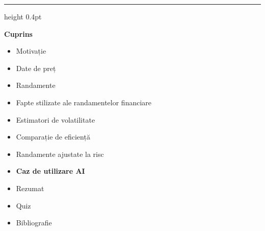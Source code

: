 \documentclass[9pt, aspectratio=169, t]{beamer}
\theoremstyle{definition}
\begin{document}
{
\begin{frame}{}
    {\color{FooterGray}\hrule height 0.4pt}
    \vspace{0.1cm}
    {\Large\textcolor{IDAred}{\textbf{Cuprins}}}
    \vspace{0.2cm}
    \begin{itemize}
        \item Motivație \checkmark
        \item Date de preț \checkmark
        \item Randamente \checkmark
        \item Fapte stilizate ale randamentelor financiare \checkmark
        \item Estimatori de volatilitate \checkmark
        \item Comparație de eficiență \checkmark
        \item Randamente ajustate la risc \checkmark
        \item \textbf{Caz de utilizare AI}
        \item Rezumat
        \item Quiz
        \item Bibliografie
    \end{itemize}
\end{frame}
}
\end{document}
